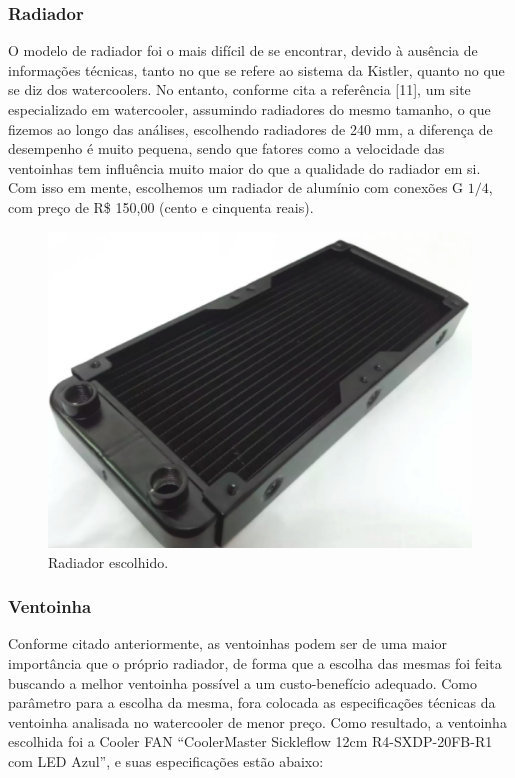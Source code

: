 \subsubsection{Radiador}

O modelo de radiador foi o mais difícil de se encontrar, devido à ausência de informações técnicas, tanto no que se refere ao sistema da Kistler, quanto no que se diz dos watercoolers. No entanto, conforme cita a referência [11], um site especializado em watercooler, assumindo radiadores do mesmo tamanho, o que fizemos ao longo das análises, escolhendo radiadores de 240 mm, a diferença de desempenho é muito pequena, sendo que fatores como a velocidade das ventoinhas tem influência muito maior do que a qualidade do radiador em si. Com isso em mente, escolhemos um radiador de alumínio com conexões G $1/4$, com preço de R\$ 150,00 (cento e cinquenta reais).

\begin{figure}[!htb]                                                               
   \centering                                                                      
   \includegraphics[scale=0.4, keepaspectratio=true]{figuras/radiador.eps}
   \caption{Radiador escolhido.}               
\end{figure}

\newpage
\subsubsection{Ventoinha}

Conforme citado anteriormente, as ventoinhas podem ser de uma maior importância que o próprio radiador, de forma que a escolha das mesmas foi feita buscando a melhor ventoinha possível a um custo-benefício adequado. Como parâmetro para a escolha da mesma, fora colocada as especificações técnicas da ventoinha analisada no watercooler de menor preço. 
Como resultado, a ventoinha escolhida foi a Cooler FAN “CoolerMaster Sickleflow 12cm R4-SXDP-20FB-R1 com LED Azul”, e suas especificações estão abaixo:

